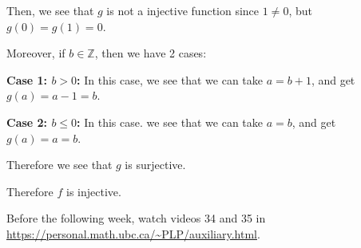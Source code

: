 \documentclass[12pt]{article}
\begin{document}
\begin{enumerate}
{\begin{enumerate}
Then, we see that $g$ is not a injective function since $1\neq 0$, but $g(0)=g(1)=0$. 

Moreover, if $b\in\mathbb Z$, then we have 2 cases:

{\bf Case 1: $b>0$:} In this case, we see that we can take $a=b+1$, and get $g(a)=a-1=b$.

{\bf Case 2: $b\leq 0$:} In this case. we see that we can take $a=b$, and get $g(a)=a=b$.

Therefore we see that $g$ is surjective.

Therefore $f$ is injective.



\end{enumerate}

}

Before the following week, watch videos 34 and 35 in \url{https://personal.math.ubc.ca/~PLP/auxiliary.html}.

\end{enumerate}
\end{document}
